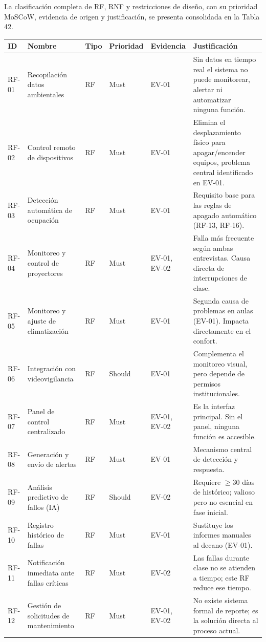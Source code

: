 La clasificación completa de RF, RNF y restricciones de diseño, con su prioridad MoSCoW, evidencia de origen y justificación, se presenta consolidada en la Tabla 42.


\begingroup
\small
\begin{longtable}{|p{2.6cm}|p{2.6cm}|p{2.6cm}|p{2.6cm}|p{2.6cm}|p{2.6cm}|}
\hline
ID & Nombre & Tipo & Prioridad & Evidencia & Justificación \\ \hline
RF-01 & Recopilación datos ambientales & RF & Must & EV-01 & Sin datos en tiempo real el sistema no puede monitorear, alertar ni automatizar ninguna función. \\ \hline
RF-02 & Control remoto de dispositivos & RF & Must & EV-01 & Elimina el desplazamiento físico para apagar/encender equipos, problema central identificado en EV-01. \\ \hline
RF-03 & Detección automática de ocupación & RF & Must & EV-01 & Requisito base para las reglas de apagado automático (RF-13, RF-16). \\ \hline
RF-04 & Monitoreo y control de proyectores & RF & Must & EV-01, EV-02 & Falla más frecuente según ambas entrevistas. Causa directa de interrupciones de clase. \\ \hline
RF-05 & Monitoreo y ajuste de climatización & RF & Must & EV-01 & Segunda causa de problemas en aulas (EV-01). Impacta directamente en el confort. \\ \hline
RF-06 & Integración con videovigilancia & RF & Should & EV-01 & Complementa el monitoreo visual, pero depende de permisos institucionales. \\ \hline
RF-07 & Panel de control centralizado & RF & Must & EV-01, EV-02 & Es la interfaz principal. Sin el panel, ninguna función es accesible. \\ \hline
RF-08 & Generación y envío de alertas & RF & Must & EV-01 & Mecanismo central de detección y respuesta. \\ \hline
RF-09 & Análisis predictivo de fallos (IA) & RF & Should & EV-02 & Requiere $\geq$30 días de histórico; valioso pero no esencial en fase inicial. \\ \hline
RF-10 & Registro histórico de fallas & RF & Must & EV-01 & Sustituye los informes manuales al decano (EV-01). \\ \hline
RF-11 & Notificación inmediata ante fallas críticas & RF & Must & EV-02 & Las fallas durante clase no se atienden a tiempo; este RF reduce ese tiempo. \\ \hline
RF-12 & Gestión de solicitudes de mantenimiento & RF & Must & EV-01, EV-02 & No existe sistema formal de reporte; es la solución directa al proceso actual. \\ \hline

\end{longtable}
